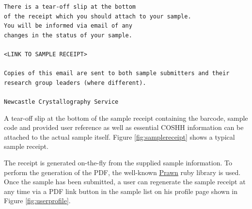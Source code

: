 \documentclass[12pt,twoside]{article}
\begin{document}
\begin{enumerate}[(i)]
\begin{verbatim}
There is a tear-off slip at the bottom
of the receipt which you should attach to your sample.
You will be informed via email of any
changes in the status of your sample.

<LINK TO SAMPLE RECEIPT>

Copies of this email are sent to both sample submitters and their
research group leaders (where different).

Newcastle Crystallography Service
\end{verbatim}
\normalsize

A tear-off slip at the bottom of the sample receipt
containing the barcode, sample code and provided user
reference as well as essential COSHH information can be attached to the
actual sample itself.
Figure \ref{fig:samplereceipt} shows a typical sample receipt.

The receipt is generated on-the-fly from the supplied sample information. 
To perform the generation of the PDF, the well-known 
\href{http://prawn.majesticseacreature.com/}{Prawn} ruby library is used.
Once the sample has been submitted, a user can regenerate the sample receipt
at any time via a PDF link button in the sample list on his profile page
shown in Figure \ref{fig:userprofile}.


\end{enumerate}
\end{document}
